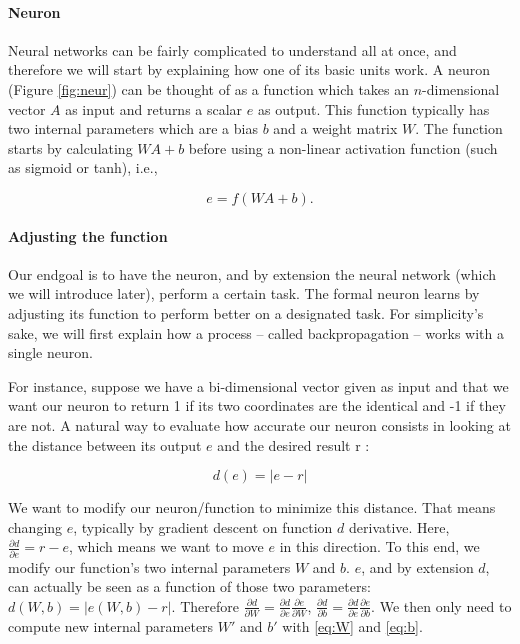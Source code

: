 \documentclass[conference]{IEEEtran}
\begin{document}
\paragraph{Neuron}

Neural networks can be fairly complicated to understand all at once, and
therefore we will start by explaining how one of its basic units work.
A neuron (Figure \ref{fig:neur}) can be thought of as a function which takes an $n$-dimensional vector
$A$ as input and returns a scalar $e$ as output. This function typically has two
internal parameters which are a bias $b$ and a weight matrix $W$. The function
starts by calculating $WA+b$ before using a non-linear activation function (such
as sigmoid or tanh), i.e.,

\begin{equation}
  e=f(WA+b).
\end{equation}

\paragraph{Adjusting the function}

Our endgoal is to have the neuron, and by extension the neural network (which we
will introduce later), perform
a certain task. The formal neuron \og learns\fg{} by adjusting its function to perform better on
a designated task. For simplicity's sake, we will first explain how a
process -- called \og backpropagation\fg{} -- works with a single neuron.

For instance, suppose we have a bi-dimensional vector given as input and that we
want our neuron to return 1 if its two coordinates are the identical and -1 if
they are not. A natural way to evaluate how accurate our neuron consists in looking at the
distance between its output $e$ and the desired result r :

\begin{equation}
d(e)=|e-r|  
\end{equation}

\noindent We want to modify our neuron/function to minimize this distance. That means
changing $e$, typically by gradient descent on function $d$ derivative. Here,
$\frac{\partial d}{\partial e} = r-e$, which means we want to \og move\fg{} $e$ in this
direction. To this end, we modify our function's two internal parameters $W$ and
$b$. $e$, and by extension $d$, can actually be seen as a function of those two
parameters: $d(W,b)=|e(W,b)-r|$. Therefore $\frac{\partial d}{\partial W}
   = \frac{\partial d}{\partial e}\frac{\partial e}{\partial W}$,
$\frac{\partial d}{\partial b}
   = \frac{\partial d}{\partial e}\frac{\partial e}{\partial b}$. We then only
   need to compute new internal parameters $W'$ and $b'$ with \ref{eq:W} and \ref{eq:b}.
\end{document}
